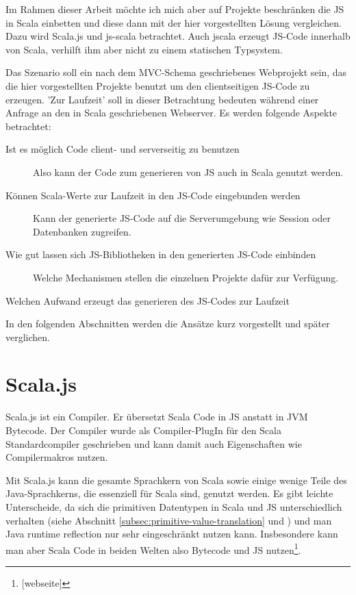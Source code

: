 \documentclass[12pt,bibtotoc]{scrreprt}
\begin{document}
Im Rahmen dieser Arbeit möchte ich mich aber auf Projekte beschränken die JS in Scala einbetten und diese dann mit der hier vorgestellten Lösung vergleichen. Dazu wird Scala.js und js-scala betrachtet. Auch jscala erzeugt JS-Code innerhalb von Scala, verhilft ihm aber nicht zu einem statischen Typsystem.

Das Szenario soll ein nach dem MVC-Schema geschriebenes Webprojekt sein, das die hier vorgestellten Projekte benutzt um den clientseitigen JS-Code zu erzeugen. 'Zur Laufzeit' soll in dieser Betrachtung bedeuten während einer Anfrage an den in Scala geschriebenen Webserver. Es werden folgende Aspekte betrachtet:

\begin{description}
 \item[Ist es möglich Code client- und serverseitig zu benutzen] Also kann der Code zum generieren von JS auch in Scala genutzt werden.
 \item[Können Scala-Werte zur Laufzeit in den JS-Code eingebunden werden] Kann der generierte JS-Code auf die Serverumgebung wie Session oder Datenbanken zugreifen.
 \item[Wie gut lassen sich JS-Bibliotheken in den generierten JS-Code einbinden] Welche Mechanismen stellen die einzelnen Projekte dafür zur Verfügung.
 \item[Welchen Aufwand erzeugt das generieren des JS-Codes zur Laufzeit]
\end{description}

In den folgenden Abschnitten werden die Ansätze kurz vorgestellt und später verglichen.

\section{Scala.js}
\label{sec:scala-js}

Scala.js ist ein Compiler. Er übersetzt Scala Code in JS anstatt in JVM Bytecode\cite{Doeraene2013}. Der Compiler wurde als Compiler-PlugIn für den Scala Standardcompiler geschrieben und kann damit auch Eigenschaften wie Compilermakros nutzen. 

Mit Scala.js kann die gesamte Sprachkern von Scala sowie einige wenige Teile des Java-Sprachkerns, die essenziell für Scala sind, genutzt werden. Es gibt leichte Unterscheide, da sich die primitiven Datentypen in Scala und JS unterschiedlich verhalten (siehe Abschnitt \ref{subsec:primitive-value-translation} und \cite{Doeraene2014}) und man Java runtime reflection nur sehr eingeschränkt nutzen kann. Insbesondere kann man aber Scala Code in beiden Welten also Bytecode und JS nutzen\footnote{[webseite]}. 
\end{document}
